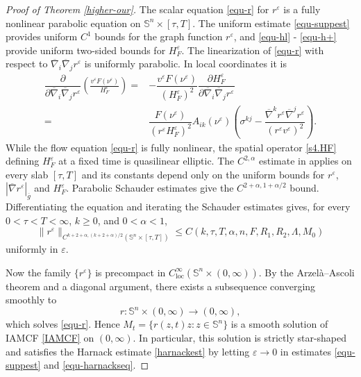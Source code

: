 \documentclass[10pt,a4paper]{amsart}
\numberwithin{equation}{section}
\begin{document}
\begin{proof}[Proof of Theorem \ref{higher-our}]
The scalar equation \eqref{equ-r} for $r^{\varepsilon}$ is a fully nonlinear parabolic equation on $\mathbb{S}^n\times[\tau,T]$. The uniform estimate \eqref{equ-suppest} provides uniform $C^{1}$ bounds for the graph function $r^{\varepsilon}$, and \eqref{equ-hl} - \eqref{equ-h+} provide uniform two-sided bounds for $H_F^{\varepsilon}$. The linearization of \eqref{equ-r} with respect to $\overline\nabla_i\overline\nabla_j r^\varepsilon$ is uniformly parabolic. In local coordinates it is
\begin{align*}
			\dfrac{\partial}{\partial \overline{\nabla}_i\overline{\nabla}_j r^{\varepsilon}}\left(\frac{v^{\varepsilon}F(\nu^{\varepsilon})}{H_F^{\varepsilon}}\right) =& -\dfrac{v^{\varepsilon}F(\nu^{\varepsilon})}{\left(H_F^{\varepsilon}\right)^2}\dfrac{\partial H_F^{\varepsilon}}{\partial \overline{\nabla}_i\overline{\nabla}_j r^{\varepsilon}} \\
			=& \dfrac{F(\nu^{\varepsilon})}{\left(r^{\varepsilon}H_F^{\varepsilon}\right)^2}A_{ik}(\nu^{\varepsilon})\left(\sigma^{kj}-\dfrac{\overline{\nabla}^k r^{\varepsilon}\overline{\nabla}^j r^{\varepsilon}}{(r^{\varepsilon}v^{\varepsilon})^2} \right).
		\end{align*}
While the flow equation \eqref{equ-r} is fully nonlinear, the spatial operator \eqref{s4.HF} defining $H_F^{\varepsilon}$ at a fixed time is quasilinear elliptic. The $C^{2,\alpha}$ estimate in \cite[Pages 119--122]{Xia17} applies on every slab $[\tau,T]$ and its constants depend only on the uniform bounds for $r^{\varepsilon}$, $|\overline{\nabla}r^{\varepsilon}|_{\overline{g}}$ and $H_F^{\varepsilon}$. Parabolic Schauder estimates give the $C^{2+\alpha,1+\alpha/2}$ bound. Differentiating the equation and iterating the Schauder estimates gives, for every $0<\tau<T<\infty$, $k\geq 0$, and $0<\alpha<1$,
\begin{equation}
	\label{equ-high}
	\|r^{\varepsilon}\|_{C^{k+2+\alpha,(k+2+\alpha)/2}(\mathbb{S}^n \times[\tau,T])}\leq C(k,\tau,T,\alpha,n,F,R_1,R_2,\Lambda,M_0)
\end{equation}
uniformly in $\varepsilon$.
        
		
		Now the family $\{r^{\varepsilon}\}$ is precompact in $C^\infty_{\mathrm{loc}}(\mathbb S^n\times(0,\infty))$. By the Arzel\`a--Ascoli theorem and a diagonal argument, there exists a subsequence converging smoothly to
		\begin{equation*}
			r:\mathbb S^n\times(0,\infty)\to(0,\infty),
		\end{equation*}
		which solves \eqref{equ-r}. Hence $M_t=\{r(z,t)z:z\in\mathbb S^n\}$ is a smooth solution of IAMCF \eqref{IAMCF} on $(0,\infty)$. In particular, this solution is strictly star-shaped and satisfies the Harnack estimate \eqref{harnackest} by letting $\varepsilon \to 0$ in estimates \eqref{equ-suppest} and \eqref{equ-harnackseq}.
		

\end{proof}
\end{document}
